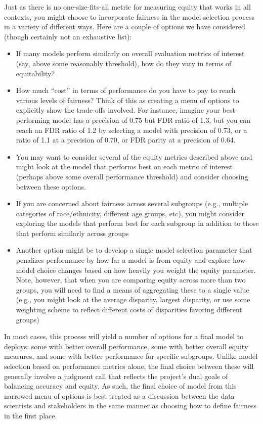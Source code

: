 \documentclass[]{krantz}
\begin{document}
Just as there is no one-size-fits-all metric for measuring equity that
works in all contexts, you might choose to incorporate fairness in the
model selection process in a variety of different ways. Here are a
couple of options we have considered (though certainly not an exhaustive
list):

\begin{itemize}
\item
  If many models perform similarly on overall evaluation metrics of
  interest (say, above some reasonably threshold), how do they vary in
  terms of equitability?
\item
  How much ``cost'' in terms of performance do you have to pay to reach
  various levels of fairness? Think of this as creating a menu of
  options to explicitly show the trade-offs involved. For instance,
  imagine your best-performing model has a precision of 0.75 but FDR
  ratio of 1.3, but you can reach an FDR ratio of 1.2 by selecting a
  model with precision of 0.73, or a ratio of 1.1 at a precision of
  0.70, or FDR parity at a precision of 0.64.
\item
  You may want to consider several of the equity metrics described above
  and might look at the model that performs best on each metric of
  interest (perhaps above some overall performance threshold) and
  consider choosing between these options.
\item
  If you are concerned about fairness across several subgroups (e.g.,
  multiple categories of race/ethnicity, different age groups, etc), you
  might consider exploring the models that perform best for each
  subgroup in addition to those that perform similarly across groups
\item
  Another option might be to develop a single model selection parameter
  that penalizes performance by how far a model is from equity and
  explore how model choice changes based on how heavily you weight the
  equity parameter. Note, however, that when you are comparing equity
  across more than two groups, you will need to find a means of
  aggregating these to a single value (e.g., you might look at the
  average disparity, largest disparity, or use some weighting scheme to
  reflect different costs of disparities favoring different groups)
\end{itemize}

In most cases, this process will yield a number of options for a final
model to deploys: some with better overall performance, some with better
overall equity measures, and some with better performance for specific
subgroups. Unlike model selection based on performance metrics alone,
the final choice between these will generally involve a judgment call
that reflects the project's dual goals of balancing accuracy and equity.
As such, the final choice of model from this narrowed menu of options is
best treated as a discussion between the data scientists and
stakeholders in the same manner as choosing how to define fairness in
the first place.
\end{document}

